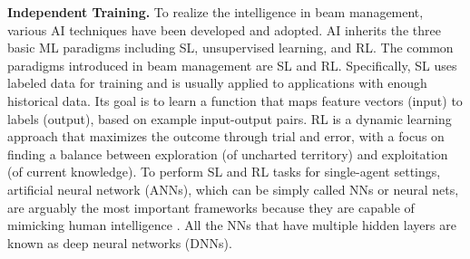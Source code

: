 \documentclass[journal,comsoc]{IEEEtran}
\begin{document}
{\bf{Independent Training.}} To realize the intelligence in beam management, various AI techniques have been developed and adopted. AI \cite{Blockchain-Artificial-Intelligence} inherits the three basic ML paradigms including SL, unsupervised learning, and RL. The common paradigms introduced in beam management are SL and RL. Specifically, SL uses labeled data for training and is usually applied to applications with enough historical data. Its goal is to learn a function that maps feature vectors (input) to labels (output), based on example input-output pairs. RL is a dynamic learning approach that maximizes the outcome through trial and error, with a focus on finding a balance between exploration (of uncharted territory) and exploitation (of current knowledge). To perform SL and RL tasks for single-agent settings, artificial neural network (ANNs), which can be simply called NNs or neural nets, are arguably the most important frameworks because they are capable of mimicking human intelligence \cite{Artificial-Neural-Networks-2019}. All the NNs that have multiple hidden layers are known as deep neural networks (DNNs).
\end{document}
